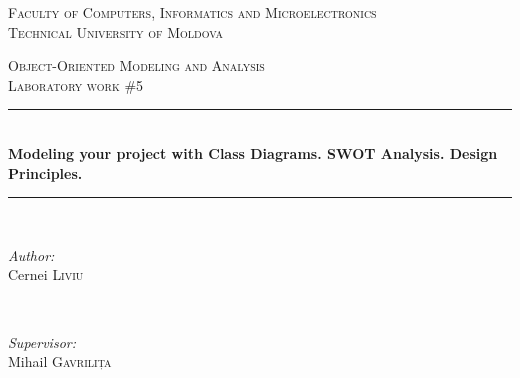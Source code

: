 \documentclass[12pt,a4paper,titlepage]{article}
\begin{document}
\begin{titlepage}

  \begin{center} %

  \textsc{\large Faculty of Computers, Informatics and Microelectronics}\\[0.5cm]
  \textsc{\large Technical University of Moldova}\\[1.2cm] %
  \vspace{25 mm}

  \textsc{\Large Object-Oriented Modeling and Analysis}\\[0.5cm] %
  \textsc{\large Laboratory work \#5}\\[0.5cm] %

\newcommand{\HRule}{\rule{\linewidth}{0.5mm}} %

  \vspace{10 mm}
  \HRule \\[0.4cm]
  { \LARGE \bfseries Modeling your project with Class Diagrams. SWOT Analysis. Design Principles. }\\[0.4cm] %
  \HRule \\[1.5cm]

      \vspace{30mm}

      \begin{minipage}{0.4\textwidth}
      \begin{flushleft} \large
      \emph{Author:}\\
      Cernei \textsc{Liviu}
      \end{flushleft}
      \end{minipage}
      ~
      \begin{minipage}{0.4\textwidth}
      \begin{flushright} \large
      \emph{Supervisor:} \\
      Mihail \textsc{Gavrilița} %
      \end{flushright}
      \end{minipage}\\[4cm]


\end{center}
\end{titlepage}
\end{document}
